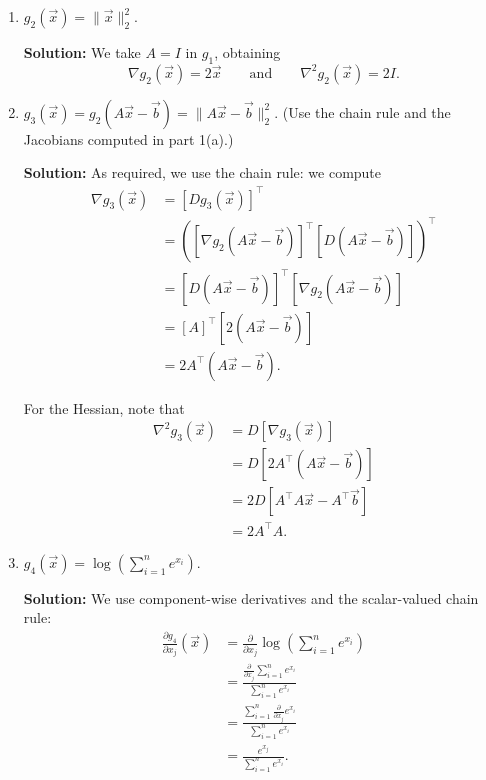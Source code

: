 \documentclass[10pt]{article}
\theoremstyle{definition}
\theoremstyle{plain}
\begin{document}
\begin{enumerate}[label=(\alph*)]
\begin{enumerate}[label=\roman*.]
    Thus we have
    \begin{equation}
    \nabla^2 g_1(\vec{x}) = A + A^\top.
    \end{equation}

    Notice the important special case that if $A$ is symmetric then $\nabla g_1(\vec{x}) = 2A\vec{x}$ and $\nabla^2 g_1(\vec{x}) = 2A$.

    \item $g_2(\vec{x}) = \|\vec{x}\|_2^2$.

    \textbf{Solution:} We take $A = I$ in $g_1$, obtaining
    \begin{equation}
    \nabla g_2(\vec{x}) = 2\vec{x} \qquad \text{and} \qquad \nabla^2 g_2(\vec{x}) = 2I.
    \end{equation}

    \item $g_3(\vec{x}) = g_2(A\vec{x} - \vec{b}) = \|A\vec{x} - \vec{b}\|_2^2$. (Use the chain rule and the Jacobians computed in part 1(a).)

    \textbf{Solution:} As required, we use the chain rule: we compute
    \begin{align}
    \nabla g_3(\vec{x}) &= [Dg_3(\vec{x})]^\top \\
    &= ([\nabla g_2(A\vec{x} - \vec{b})]^\top [D(A\vec{x} - \vec{b})])^\top \\
    &= [D(A\vec{x} - \vec{b})]^\top [\nabla g_2(A\vec{x} - \vec{b})] \\
    &= [A]^\top [2(A\vec{x} - \vec{b})] \\
    &= 2A^\top(A\vec{x} - \vec{b}).
    \end{align}

    For the Hessian, note that
    \begin{align}
    \nabla^2 g_3(\vec{x}) &= D[\nabla g_3(\vec{x})] \\
    &= D[2A^\top(A\vec{x} - \vec{b})] \\
    &= 2D[A^\top A \vec{x} - A^\top \vec{b}] \\
    &= 2A^\top A.
    \end{align}

    \item $g_4(\vec{x}) = \log\!\left(\sum_{i=1}^n e^{x_i}\right)$.

    \textbf{Solution:} We use component-wise derivatives and the scalar-valued chain rule:
    \begin{align}
    \frac{\partial g_4}{\partial x_j}(\vec{x}) &= \frac{\partial}{\partial x_j}\log\left(\sum_{i=1}^n e^{x_i}\right) \\
    &= \frac{\frac{\partial}{\partial x_j}\sum_{i=1}^n e^{x_i}}{\sum_{i=1}^n e^{x_i}} \\
    &= \frac{\sum_{i=1}^n \frac{\partial}{\partial x_j} e^{x_i}}{\sum_{i=1}^n e^{x_i}} \\
    &= \frac{e^{x_j}}{\sum_{i=1}^n e^{x_i}}.
    \end{align}


\end{enumerate}
\end{enumerate}
\end{document}
